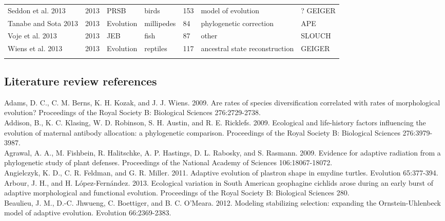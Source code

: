 \documentclass[a4paper,12pt]{article}
\begin{document}
\begin{landscape}
\begin{center}
\begin{longtable}{p{6cm}llllll}
Seddon et al. 2013    &   2013    &   PRSB    &   birds   &   153 &   model of evolution  &   ? GEIGER  \\
Tanabe and Sota 2013  &   2013    &   Evolution   &   millipedes  &   84  &   phylogenetic correction &   APE \\
Voje et al. 2013  &   2013    &   JEB &   fish    &   87  &   other   &   SLOUCH  \\
Wiens et al. 2013 &   2013    &   Evolution   &   reptiles    &   117 &   ancestral state reconstruction  &   GEIGER  \\
\hline
\label{table:litreview}
\end{longtable}
\end{center}
\end{landscape}
   
\subsection{Literature review references}
\label{section:refs} 
\indent
Adams, D. C., C. M. Berns, K. H. Kozak, and J. J. Wiens. 2009. Are rates of species diversification correlated with rates of morphological evolution? Proceedings of the Royal Society B: Biological Sciences 276:2729-2738.\\
Addison, B., K. C. Klasing, W. D. Robinson, S. H. Austin, and R. E. Ricklefs. 2009. Ecological and life-history factors influencing the evolution of maternal antibody allocation: a phylogenetic comparison. Proceedings of the Royal Society B: Biological Sciences 276:3979-3987.\\
Agrawal, A. A., M. Fishbein, R. Halitschke, A. P. Hastings, D. L. Rabosky, and S. Rasmann. 2009. Evidence for adaptive radiation from a phylogenetic study of plant defenses. Proceedings of the National Academy of Sciences 106:18067-18072.\\
Angielczyk, K. D., C. R. Feldman, and G. R. Miller. 2011. Adaptive evolution of plastron shape in emydine turtles. Evolution 65:377-394.\\
Arbour, J. H., and H. L\'{o}pez-Fern\'{a}ndez. 2013. Ecological variation in South American geophagine cichlids arose during an early burst of adaptive morphological and functional evolution. Proceedings of the Royal Society B: Biological Sciences 280.\\
Beaulieu, J. M., D.-C. Jhwueng, C. Boettiger, and B. C. O’Meara. 2012. Modeling stabilizing selection: expanding the Ornstein-Uhlenbeck model of adaptive evolution. Evolution 66:2369-2383.\\
\end{document}
